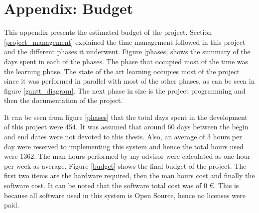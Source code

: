	\section{Appendix: Budget}
		This appendix presents the estimated budget of the project. 
		Section \ref{project_management} explained the time management followed in this project and the different phases it underwent. 
		Figure \ref{phases} shows the summary of the days spent in each of the phases. 
		The phase that occupied most of the time was the learning phase. 
		The state of the art learning occupies most of the project since it was performed in parallel with most of the other phases, as can be seen in figure \ref{gantt_diagram}. 
		The next phase in size is the project programming and then the documentation of the project. 





		It can be seen from figure \ref{phases} that the total days spent in the development of this project were 454. 
		It was assumed that around 60 days between the begin and end dates were not devoted to this thesis. 
		Also, an average of 3 hours per day were reserved to implementing this system and hence the total hours used were 1362. 
		The man hours performed by my advisor were calculated as one hour per week as average. 
		Figure \ref{budget} shows the final budget of the project. 
		The first two items are the hardware required, then the man hours cost and finally the software cost. 
		It can be noted that the software total cost was of 0 \euro. 
		This is because all software used in this system is Open Source, hence no licenses were paid. 



